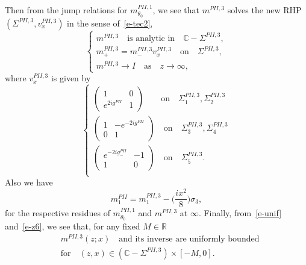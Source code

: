 \documentclass{amsart}
\theoremstyle{definition}
\theoremstyle{remark}
\numberwithin{equation}{section}
\newcommand{\C}{\mathbb C}
\newcommand{\R}{\mathbb R}
\begin{document}
Then from the jump relations for $m_{\theta_0}^{PII,1}$,  
we see that $m^{PII,3}$ solves the new RHP 
$(\Sigma^{PII,3}, v_{x}^{PII,3})$ in the sense of~\eqref{e-tec2}, 
\begin{equation}\label{e-z17}
  \begin{cases}
    m^{PII,3}\quad\text{is analytic in}\quad\C-\Sigma^{PII,3},\\
    m^{PII,3}_+=m^{PII,3}_-v^{PII,3}_x\quad\text{on}
\quad\Sigma^{PII,3},\\
    m^{PII,3}\to I\quad\text{as}\quad z\to\infty,
  \end{cases}
\end{equation}
where $v^{PII,3}_{x}$ is given by 
\begin{equation}\label{e-vPII4}
  \begin{cases}
     \begin{pmatrix}1&0\\e^{2ig^{PII}}&1 \end{pmatrix}
\qquad\text{on}\quad \Sigma_1^{PII,3},\Sigma_2^{PII,3}\\
     \begin{pmatrix}1&-e^{-2ig^{PII}}\\0&1 \end{pmatrix}
\quad\text{on}\quad \Sigma_3^{PII,3},\Sigma_4^{PII,3}\\
     \begin{pmatrix}e^{-2ig_{-}^{PII}}&-1\\1&0 \end{pmatrix}
\quad\text{on}\quad \Sigma_5^{PII,3}.\\
  \end{cases}
\end{equation}
Also we have
\begin{equation}\label{e-mPmP4}
   m_1^{PII}=m_1^{PII,3}-\bigl( \frac{ix^2}{8} \bigr)\sigma_3,
\end{equation}
for the respective residues of $m_{\theta_0}^{PII,1}$ and $m^{PII,3}$ 
at $\infty$. 
Finally, from~\eqref{e-unif} and~\eqref{e-z6}, 
we see that, for any fixed $M\in\R$
\begin{equation}\label{e-unif4}
  \begin{split}
   &m^{PII,3}(z;x) \quad\text{and its inverse are uniformly bounded}\\
&\text{for}\quad  (z,x)\in(\C-\Sigma^{PII,3})\times[-M,0].
  \end{split}
\end{equation}

\end{document}
